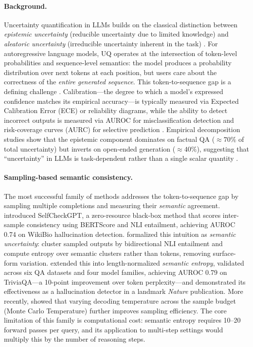 \paragraph{Background.}
Uncertainty quantification in LLMs builds on the classical distinction between \emph{epistemic uncertainty} (reducible uncertainty due to limited knowledge) and \emph{aleatoric uncertainty} (irreducible uncertainty inherent in the task) \cite{HeEtAl2023}. For autoregressive language models, UQ operates at the intersection of token-level probabilities and sequence-level semantics: the model produces a probability distribution over next tokens at each position, but users care about the correctness of the \emph{entire generated sequence}. This token-to-sequence gap is a defining challenge \cite{GengEtAl2024, LiuEtAl2025c}. Calibration---the degree to which a model's expressed confidence matches its empirical accuracy---is typically measured via Expected Calibration Error (ECE) or reliability diagrams, while the ability to detect incorrect outputs is measured via AUROC for misclassification detection and risk-coverage curves (AURC) for selective prediction \cite{HuangEtAl2024, WenEtAl2025}. Empirical decomposition studies show that the epistemic component dominates on factual QA (${\approx}70\%$ of total uncertainty) but inverts on open-ended generation (${\approx}40\%$), suggesting that ``uncertainty'' in LLMs is task-dependent rather than a single scalar quantity \cite{WangEtAl2025b, KirchhofEtAl2025}.

\paragraph{Sampling-based semantic consistency.}
The most successful family of methods addresses the token-to-sequence gap by sampling multiple completions and measuring their \emph{semantic} agreement. \citet{ManakulEtAl2023} introduced SelfCheckGPT, a zero-resource black-box method that scores inter-sample consistency using BERTScore and NLI entailment, achieving AUROC 0.74 on WikiBio hallucination detection. \citet{KuhnEtAl2023} formalized this intuition as \emph{semantic uncertainty}: cluster sampled outputs by bidirectional NLI entailment and compute entropy over semantic clusters rather than tokens, removing surface-form variation. \citet{FarquharEtAl2024} extended this into length-normalized \emph{semantic entropy}, validated across six QA datasets and four model families, achieving AUROC 0.79 on TriviaQA---a 10-point improvement over token perplexity---and demonstrated its effectiveness as a hallucination detector in a landmark \emph{Nature} publication. More recently, \citet{CecereEtAl2025} showed that varying decoding temperature across the sample budget (Monte Carlo Temperature) further improves sampling efficiency. The core limitation of this family is computational cost: semantic entropy requires 10--20 forward passes per query, and its application to multi-step settings would multiply this by the number of reasoning steps.

